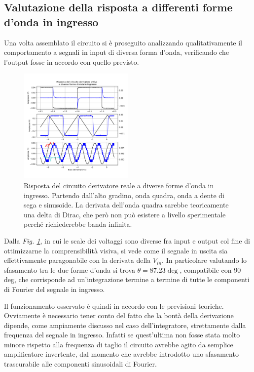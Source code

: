 \documentclass[journal]{IEEEtran}
\begin{document}
\subsection{\textbf{Valutazione della risposta a differenti forme d'onda in ingresso}}
Una volta assemblato il circuito si è proseguito analizzando qualitativamente il comportamento a segnali in input di diversa forma d'onda, verificando che l'output fosse in accordo con quello previsto.

\begin{figure}[H]%
\begin{center}
\includegraphics[width=0.50\textwidth]{analysis/output/OPA-differentiator.pdf}
\caption{Risposta del circuito derivatore reale a diverse forme d’onda in ingresso. Partendo dall’alto gradino, onda quadra, onda a dente di sega e sinusoide. La derivata dell'onda quadra sarebbe teoricamente una delta di Dirac, che però non può esistere a livello sperimentale perché richiederebbe banda infinita.}
\label{fig:derivatore}
\end{center}
\end{figure}

Dalla \textit{Fig. \ref{fig:derivatore}}, in cui le scale dei voltaggi sono diverse fra input e output col fine di ottimizzarne la comprensibilità visiva, si vede come il segnale in uscita sia effettivamente paragonabile con la derivata della $V_{in}$. In particolare valutando lo sfasamento tra le due forme d'onda si trova $\theta = 87.23 \deg$, compatibile con 90 deg, che corrisponde ad un'integrazione termine a termine di tutte le componenti di Fourier del segnale in ingresso.

Il funzionamento osservato è quindi in accordo con le previsioni teoriche. Ovviamente è necessario tener conto del fatto che la bontà della derivazione dipende, come ampiamente discusso nel caso dell'integratore, strettamente dalla frequenza del segnale in ingresso. Infatti se quest'ultima non fosse stata molto minore rispetto alla frequenza di taglio il circuito avrebbe agito da semplice amplificatore invertente, dal momento che avrebbe introdotto uno sfasamento trascurabile alle componenti sinusoidali di Fourier.
\end{document}
